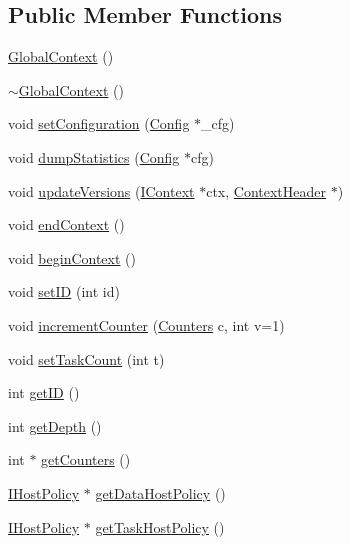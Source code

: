 \subsection*{Public Member Functions}
\begin{DoxyCompactItemize}
\item 
\hyperlink{class_global_context_aa52ca8a774611923c64fd9b2cc1a58a2}{GlobalContext} ()
\item 
\hyperlink{class_global_context_a91e18c107ec197cdafef0c13c2ac9f01}{$\sim$GlobalContext} ()
\item 
void \hyperlink{class_global_context_a7bf92109c22a9c883b6ca92143098019}{setConfiguration} (\hyperlink{class_config}{Config} $\ast$\_\-cfg)
\item 
void \hyperlink{class_global_context_acc1cb373d80601e3a43f28db871aac10}{dumpStatistics} (\hyperlink{class_config}{Config} $\ast$cfg)
\item 
void \hyperlink{class_global_context_a679f0c93603ce63c3690e578372f23b5}{updateVersions} (\hyperlink{class_i_context}{IContext} $\ast$ctx, \hyperlink{class_context_header}{ContextHeader} $\ast$)
\item 
void \hyperlink{class_global_context_a67e7eba1f3ea2ff2cc9d321a64f8d2b4}{endContext} ()
\item 
void \hyperlink{class_global_context_a9d7b59f27bc2226614fe2a65f6c3d5d1}{beginContext} ()
\item 
void \hyperlink{class_global_context_a4e609aa8aeab13c2529b7a3f3d204ec5}{setID} (int id)
\item 
void \hyperlink{class_global_context_a9348325efe41d1edae48c4313d07dc1a}{incrementCounter} (\hyperlink{class_global_context_a5b47a178f9158cfca3d760cbe1a0a115}{Counters} c, int v=1)
\item 
void \hyperlink{class_global_context_a7d41742f16955cf6a007a95797fa52ac}{setTaskCount} (int t)
\item 
int \hyperlink{class_global_context_aed100f956efac564393ecdc088f1ef54}{getID} ()
\item 
int \hyperlink{class_global_context_a1142264190522f36cd19e2f3cd3d5d51}{getDepth} ()
\item 
int $\ast$ \hyperlink{class_global_context_a6bf21d326b4dec65505b1296170498ed}{getCounters} ()
\item 
\hyperlink{class_i_host_policy}{IHostPolicy} $\ast$ \hyperlink{class_global_context_a8770ae3435a92b44cdc1286e1668c9c8}{getDataHostPolicy} ()
\item 
\hyperlink{class_i_host_policy}{IHostPolicy} $\ast$ \hyperlink{class_global_context_ade353fcc225ba76065ff6fca6924e944}{getTaskHostPolicy} ()

\end{DoxyCompactItemize}
